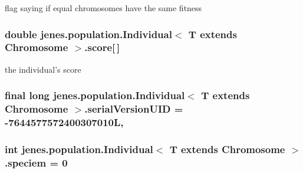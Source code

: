 flag saying if equal chromosomes have the same fitness \hypertarget{classjenes_1_1population_1_1_individual_3_01_t_01extends_01_chromosome_01_4_a1abd72838faa3246dbf498f66ed7963a}{
\subsubsection[{score}]{\setlength{\rightskip}{0pt plus 5cm}double jenes.\-population.\-Individual$<$ T extends Chromosome $>$.score\mbox{[}$\,$\mbox{]}\hspace{0.3cm}{\ttfamily [private]}}}\label{classjenes_1_1population_1_1_individual_3_01_t_01extends_01_chromosome_01_4_a1abd72838faa3246dbf498f66ed7963a}
the individual's score \hypertarget{classjenes_1_1population_1_1_individual_3_01_t_01extends_01_chromosome_01_4_a4479bb5b4c3aa508f88f06585fa78be1}{
\subsubsection[{serial\-Version\-U\-I\-D}]{\setlength{\rightskip}{0pt plus 5cm}final long jenes.\-population.\-Individual$<$ T extends Chromosome $>$.serial\-Version\-U\-I\-D = -\/7644577572400307010\-L\hspace{0.3cm}{\ttfamily [static]}, {\ttfamily [private]}}}\label{classjenes_1_1population_1_1_individual_3_01_t_01extends_01_chromosome_01_4_a4479bb5b4c3aa508f88f06585fa78be1}
\hypertarget{classjenes_1_1population_1_1_individual_3_01_t_01extends_01_chromosome_01_4_a8f5c7ae0c537b3f59be861f78d0bdf1b}{
\subsubsection[{speciem}]{\setlength{\rightskip}{0pt plus 5cm}int jenes.\-population.\-Individual$<$ T extends Chromosome $>$.speciem = 0\hspace{0.3cm}{\ttfamily [private]}}}\label{classjenes_1_1population_1_1_individual_3_01_t_01extends_01_chromosome_01_4_a8f5c7ae0c537b3f59be861f78d0bdf1b}
